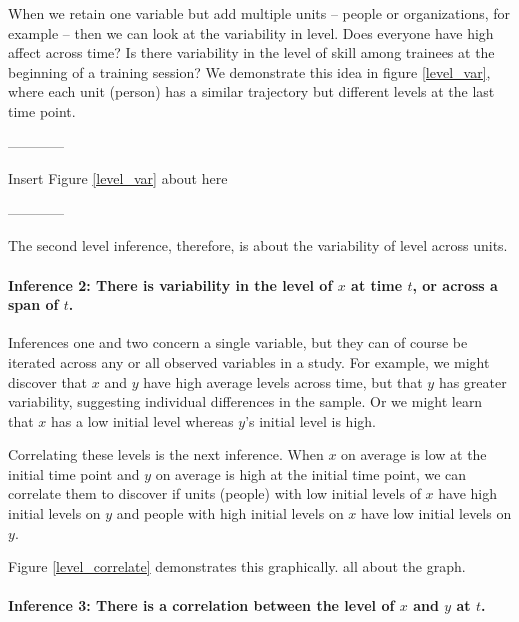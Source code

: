 \documentclass[english,,man]{apa6}
\let\oldparagraph\paragraph
\renewcommand{\paragraph}[1]{\oldparagraph{#1}\mbox{}}
\theoremstyle{definition}
\theoremstyle{definition}
\theoremstyle{definition}
\theoremstyle{remark}
\begin{document}
When we retain one variable but add multiple units -- people or
organizations, for example -- then we can look at the variability in
level. Does everyone have high affect across time? Is there variability
in the level of skill among trainees at the beginning of a training
session? We demonstrate this idea in figure \ref{level_var}, where each
unit (person) has a similar trajectory but different levels at the last
time point.

\begin{center}

------------

Insert Figure \ref{level_var} about here

------------

\end{center}

\noindent The second level inference, therefore, is about the
variability of level across units.

\hypertarget{inference-2-there-is-variability-in-the-level-of-x-at-time-t-or-across-a-span-of-t.}{%
\paragraph{\texorpdfstring{Inference 2: There is variability in the
level of \(x\) at time \(t\), or across a span of
\(t\).}{Inference 2: There is variability in the level of x at time t, or across a span of t.}}\label{inference-2-there-is-variability-in-the-level-of-x-at-time-t-or-across-a-span-of-t.}}

Inferences one and two concern a single variable, but they can of course
be iterated across any or all observed variables in a study. For
example, we might discover that \(x\) and \(y\) have high average levels
across time, but that \(y\) has greater variability, suggesting
individual differences in the sample. Or we might learn that \(x\) has a
low initial level whereas \(y\)'s initial level is high.

Correlating these levels is the next inference. When \(x\) on average is
low at the initial time point and \(y\) on average is high at the
initial time point, we can correlate them to discover if units (people)
with low initial levels of \(x\) have high initial levels on \(y\) and
people with high initial levels on \(x\) have low initial levels on
\(y\).

Figure \ref{level_correlate} demonstrates this graphically. all about
the graph.

\hypertarget{inference-3-there-is-a-correlation-between-the-level-of-x-and-y-at-t.}{%
\paragraph{\texorpdfstring{Inference 3: There is a correlation between
the level of \(x\) and \(y\) at
\(t\).}{Inference 3: There is a correlation between the level of x and y at t.}}\label{inference-3-there-is-a-correlation-between-the-level-of-x-and-y-at-t.}}
\end{document}

